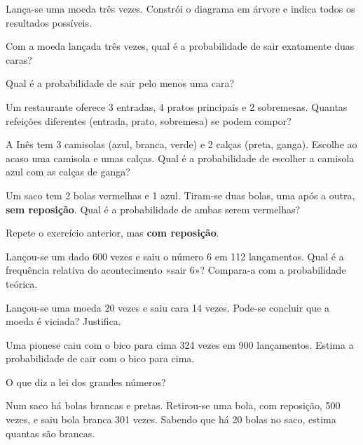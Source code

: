 \documentclass[12pt]{article}
\begin{document}
\begin{exercicios}
  \item Lança-se uma moeda três vezes. Constrói o diagrama em árvore e indica todos os resultados possíveis.
  \item Com a moeda lançada três vezes, qual é a probabilidade de sair exatamente duas caras?
  \item Qual é a probabilidade de sair pelo menos uma cara?
  \item Um restaurante oferece 3 entradas, 4 pratos principais e 2 sobremesas. Quantas refeições diferentes (entrada, prato, sobremesa) se podem compor?
  \item A Inês tem 3 camisolas (azul, branca, verde) e 2 calças (preta, ganga). Escolhe ao acaso uma camisola e umas calças. Qual é a probabilidade de escolher a camisola azul com as calças de ganga?
  \item Um saco tem 2 bolas vermelhas e 1 azul. Tiram-se duas bolas, uma após a outra, \textbf{sem reposição}. Qual é a probabilidade de ambas serem vermelhas?
  \item Repete o exercício anterior, mas \textbf{com reposição}.
\end{exercicios}

\begin{exercicios}
  \item Lançou-se um dado 600 vezes e saiu o número 6 em 112 lançamentos. Qual é a frequência relativa do acontecimento «sair 6»? Compara-a com a probabilidade teórica.
  \item Lançou-se uma moeda 20 vezes e saiu cara 14 vezes. Pode-se concluir que a moeda é viciada? Justifica.
  \item Uma pionese caiu com o bico para cima 324 vezes em 900 lançamentos. Estima a probabilidade de cair com o bico para cima.
  \item O que diz a lei dos grandes números?
  \item Num saco há bolas brancas e pretas. Retirou-se uma bola, com reposição, 500 vezes, e saiu bola branca 301 vezes. Sabendo que há 20 bolas no saco, estima quantas são brancas.
\end{exercicios}
\end{document}
